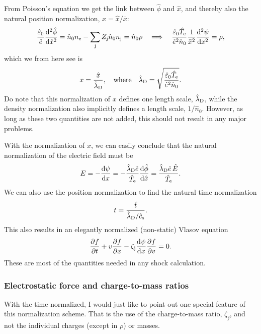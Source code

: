 \documentclass[11pt,a4paper, 
swedish, english %
]{article}
\begin{document}
From Poisson's equation we get the link between $\hat{\phi}$ and
$\hat{x}$, and thereby also the natural position normalization,
$x=\hat{x}/\bar{x}$: 
\begin{equation}
\frac{\hat{\varepsilon}_0}{\hat{e}}\dv[2]{\hat{\phi}}{\hat{x}}=
\hat{n}_0n_{\mathrm{e}}-\sum_{\mathrm{j}}Z_{\mathrm{j}}\hat{n}_0n_{\mathrm{j}}=\hat{n}_{0}\rho
\quad\Longrightarrow\quad
\frac{\hat{\varepsilon}_0\hat{T}_{\mathrm{e}}}{\hat{e}^2\hat{n}_0}
\frac{1}{\bar{x}^2}\dv[2]{\psi}{x}=\rho,
\end{equation}
which we from here see is
\begin{equation}
x=\frac{\hat{x}}{\hlD},\qq{where}
\hlD=\sqrt{\frac{\hat{\varepsilon}_0\hat{T}_{\ee}}{\hat{e}^2\hat{n}_0}}.
\end{equation}
Do note that this normalization of $x$ defines one length scale,
$\hat{\lambda}_{\text{D}}$, while the density normalization also implicitly defines a
length scale, $1/\hat{n}_{0}$. However, as long as these two
quantities are not added, this should not result in any major
problems.


With the normalization of $x$, we can easily conclude that the
natural normalization of the electric field must be
\begin{equation}
E=-\dv{\psi}{x}=-\frac{\hat{\lambda}_{\text{D}}\hat{e}}{\hat{T}_{\mathrm{e}}}\dv{\hat{\phi}}{\hat{x}}
=\frac{\hat{\lambda}_{\text{D}}\hat{e} \,\hat{E}}{\hat{T}_{\mathrm{e}}}.
\end{equation}
We can also use the position normalization to find the natural time
normalization
\begin{equation}
t=\frac{\hat{t}}{\hat{\lambda}_{\text{D}}/\hat{c}_{\text{s}}}.
\end{equation}
This also results in an elegantly normalized (non-static) Vlasov
equation 
\begin{equation}
\pdv{f}{t}+v\pdv{f}{x}-\zeta_{\mathrm{j}}\dv{\psi}{x}\pdv{f}{v}=0. 
\end{equation}
These are most of the quantities needed in any shock calculation.

\subsubsection{Electrostatic force and charge-to-mass ratios}
\label{sec:zeta}
With the time normalized, I would just like to point out one special
feature of this normalization scheme. That is the use of the
charge-to-mass ratio, $\zeta_\jj$, and not the individual charges
(except in $\rho$) or masses.
\end{document}
